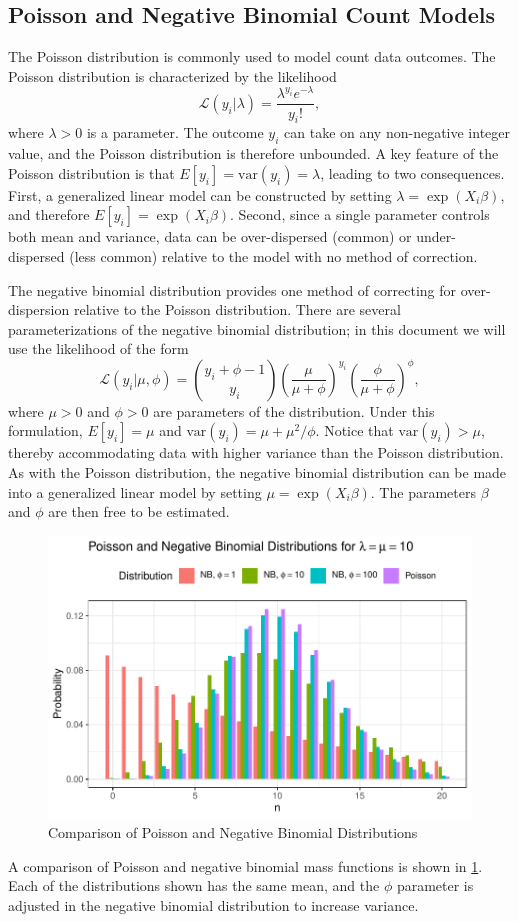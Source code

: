 \documentclass{article}
\newcommand{\lik}{\mathcal{L}}
\newcommand{\var}{\mbox{var}}
\begin{document}
\subsection{Poisson and Negative Binomial Count Models}

The Poisson distribution is commonly used to model count data outcomes. The Poisson distribution is characterized by the likelihood
\begin{equation}
	\lik(y_i | \lambda) = \frac{\lambda^{y_i}e^{-\lambda}}{y_i!},
\end{equation}
where $\lambda>0$ is a parameter. The outcome $y_i$ can take on any non-negative integer value, and the Poisson distribution is therefore unbounded. A key feature of the Poisson distribution is that $E[y_i] = \var(y_i) = \lambda$, leading to two consequences. First, a generalized linear model can be constructed by setting $\lambda = \exp(X_i\beta)$, and therefore $E[y_i] = \exp(X_i\beta)$. Second, since a single parameter controls both mean and variance, data can be over-dispersed (common) or under-dispersed (less common) relative to the model with no method of correction.

The negative binomial distribution provides one method of correcting for over-dispersion relative to the Poisson distribution. There are several parameterizations of the negative binomial distribution; in this document we will use the likelihood of the form
\begin{equation}
	\lik(y_i | \mu, \phi) = {{y_i + \phi - 1}\choose{y_i}} \left(\frac{\mu}{\mu + \phi}\right)^{y_i} \left(\frac{\phi}{\mu + \phi}\right)^\phi,
\end{equation}
where $\mu>0$ and $\phi>0$ are parameters of the distribution. Under this formulation, $E[y_i] = \mu$ and $\var(y_i) = \mu + \mu^2 / \phi$. Notice that $\var(y_i) > \mu$, thereby accommodating data with higher variance than the Poisson distribution. As with the Poisson distribution, the negative binomial distribution can be made into a generalized linear model by setting $\mu = \exp(X_i\beta)$. The parameters $\beta$ and $\phi$ are then free to be estimated.

\begin{figure}
	\centering
	\includegraphics[width=6in]{plotting/poisson-nb.pdf}
	\caption{Comparison of Poisson and Negative Binomial Distributions}
	\label{fig:poisson-nb}
\end{figure}

A comparison of Poisson and negative binomial mass functions is shown in \cref{fig:poisson-nb}. Each of the distributions shown has the same mean, and the $\phi$ parameter is adjusted in the negative binomial distribution to increase variance.
\end{document}
